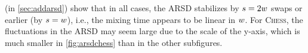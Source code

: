  (in \cref{sec:addarsd}) show that in all cases, the
ARSD stabilizes by $s = 2 w$ swaps or earlier (by $s =
w$), i.e., the mixing time appears to be linear in $w$. For
\textsc{Chess}, the fluctuations in the ARSD may seem large due to the scale of
the y-axis, which is much smaller in \cref{fig:arsdchess} than in the other
subfigures.
